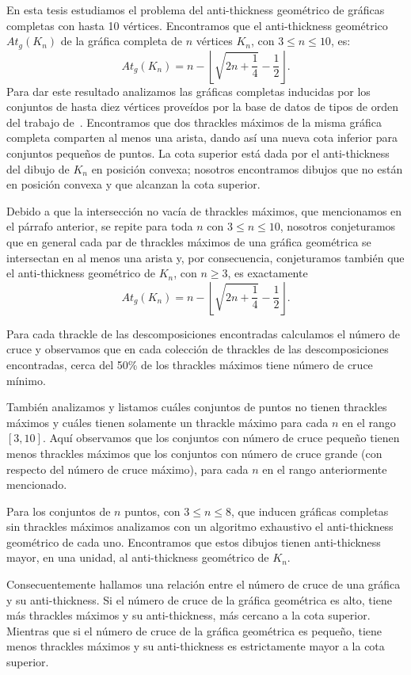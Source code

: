 En esta tesis estudiamos el problema del anti-thickness geométrico de gráficas completas con hasta 10
vértices. Encontramos que el anti-thickness geométrico $At_g(K_n)$ de la gráfica completa de $n$
vértices $K_n$, con $ 3 \leq n \leq 10$, es:
\[ At_g(K_n) =  n - \left\lfloor \sqrt{2n + \frac{1}{4}} - \frac{1}{2}\right\rfloor. \]
Para dar este resultado analizamos las gráficas completas inducidas por los conjuntos de hasta diez
vértices proveídos por la base de datos de tipos de orden del trabajo de~\cite{Aichholzer2001}. Encontramos
que dos thrackles máximos de la misma gráfica completa comparten al menos una arista, dando así una nueva
cota inferior para conjuntos pequeños de puntos. La cota superior está dada por el anti-thickness del
dibujo de $K_n$ en posición convexa; nosotros encontramos dibujos que no están en posición convexa y que
alcanzan la cota superior.

Debido a que la intersección no vacía de thrackles máximos, que mencionamos en el párrafo anterior, se
repite para toda $n$ con $3 \leq n \leq 10$,  nosotros conjeturamos que en general cada par de thrackles
máximos de una gráfica geométrica se intersectan en al menos una arista y, por consecuencia, conjeturamos
también que el anti-thickness geométrico de $K_n$, con $n \geq 3$, es exactamente
\[ At_g(K_n) =  n - \left\lfloor \sqrt{2n + \frac{1}{4}} - \frac{1}{2}\right\rfloor. \]

Para cada thrackle de las descomposiciones encontradas calculamos el número
de cruce y observamos que en cada colección de thrackles de las descomposiciones encontradas, cerca del
50\% de los thrackles máximos tiene número de cruce mínimo.

También analizamos y listamos cuáles conjuntos de puntos no tienen thrackles máximos y cuáles tienen
solamente un thrackle máximo para cada $n$ en el rango $[3,10]$. Aquí observamos que los
conjuntos con número de cruce pequeño tienen menos thrackles máximos que los conjuntos con número de
cruce grande (con respecto del número de cruce máximo), para cada $n$ en el rango anteriormente mencionado.

Para los conjuntos de $n$ puntos, con $3 \leq n \leq 8$, que inducen gráficas completas sin thrackles
máximos analizamos con un algoritmo exhaustivo el anti-thickness geométrico de cada uno. Encontramos que
estos dibujos tienen anti-thickness mayor, en una unidad, al anti-thickness geométrico de $K_n$.

Consecuentemente hallamos una relación entre el número de cruce de una gráfica y su anti-thickness. Si el
número de cruce de la gráfica geométrica es alto, tiene más thrackles máximos y su anti-thickness, más
cercano a la cota superior. Mientras que si el número de cruce de la gráfica geométrica es pequeño, tiene
menos thrackles máximos y su anti-thickness es estrictamente mayor a la cota superior.

